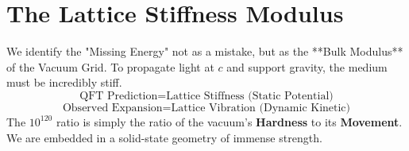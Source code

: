 \documentclass[11pt, letterpaper, openany]{book}
\begin{document}
\section{The Lattice Stiffness Modulus}
We identify the "Missing Energy" not as a mistake, but as the **Bulk Modulus** of the Vacuum Grid.
To propagate light at $c$ and support gravity, the medium must be incredibly stiff.
\begin{equation}
    \text{QFT Prediction} = \text{Lattice Stiffness (Static Potential)}
\end{equation}
\begin{equation}
    \text{Observed Expansion} = \text{Lattice Vibration (Dynamic Kinetic)}
\end{equation}
The $10^{120}$ ratio is simply the ratio of the vacuum's \textbf{Hardness} to its \textbf{Movement}. We are embedded in a solid-state geometry of immense strength.
\end{document}
